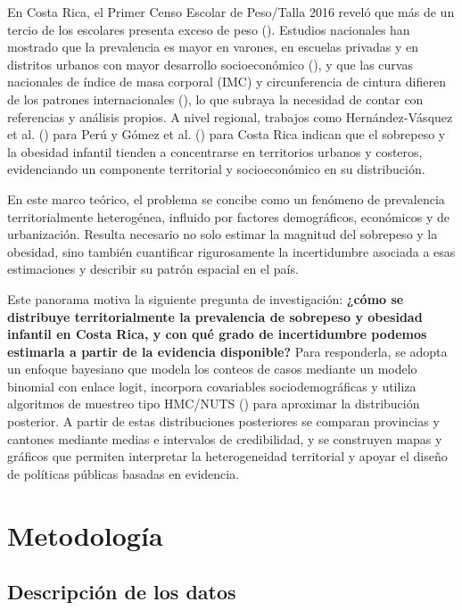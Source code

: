 \documentclass[
]{article}
\begin{document}
En Costa Rica, el Primer Censo Escolar de Peso/Talla 2016 reveló que más
de un tercio de los escolares presenta exceso de peso
(). Estudios nacionales han
mostrado que la prevalencia es mayor en varones, en escuelas privadas y
en distritos urbanos con mayor desarrollo socioeconómico
(), y que las
curvas nacionales de índice de masa corporal (IMC) y circunferencia de
cintura difieren de los patrones internacionales
(), lo que subraya la
necesidad de contar con referencias y análisis propios. A nivel
regional, trabajos como Hernández-Vásquez et al.
() para Perú y Gómez et al.
() para Costa Rica indican que el
sobrepeso y la obesidad infantil tienden a concentrarse en territorios
urbanos y costeros, evidenciando un componente territorial y
socioeconómico en su distribución.

En este marco teórico, el problema se concibe como un fenómeno de
prevalencia territorialmente heterogénea, influido por factores
demográficos, económicos y de urbanización. Resulta necesario no solo
estimar la magnitud del sobrepeso y la obesidad, sino también
cuantificar rigurosamente la incertidumbre asociada a esas estimaciones
y describir su patrón espacial en el país.

Este panorama motiva la siguiente pregunta de investigación:
\textbf{¿cómo se distribuye territorialmente la prevalencia de sobrepeso
y obesidad infantil en Costa Rica, y con qué grado de incertidumbre
podemos estimarla a partir de la evidencia disponible?} Para
responderla, se adopta un enfoque bayesiano que modela los conteos de
casos mediante un modelo binomial con enlace logit, incorpora
covariables sociodemográficas y utiliza algoritmos de muestreo tipo
HMC/NUTS ()
para aproximar la distribución posterior. A partir de estas
distribuciones posteriores se comparan provincias y cantones mediante
medias e intervalos de credibilidad, y se construyen mapas y gráficos
que permiten interpretar la heterogeneidad territorial y apoyar el
diseño de políticas públicas basadas en evidencia.

\section{Metodología}\label{metodologuxeda}

\subsection{Descripción de los datos}\label{descripciuxf3n-de-los-datos}
\end{document}
